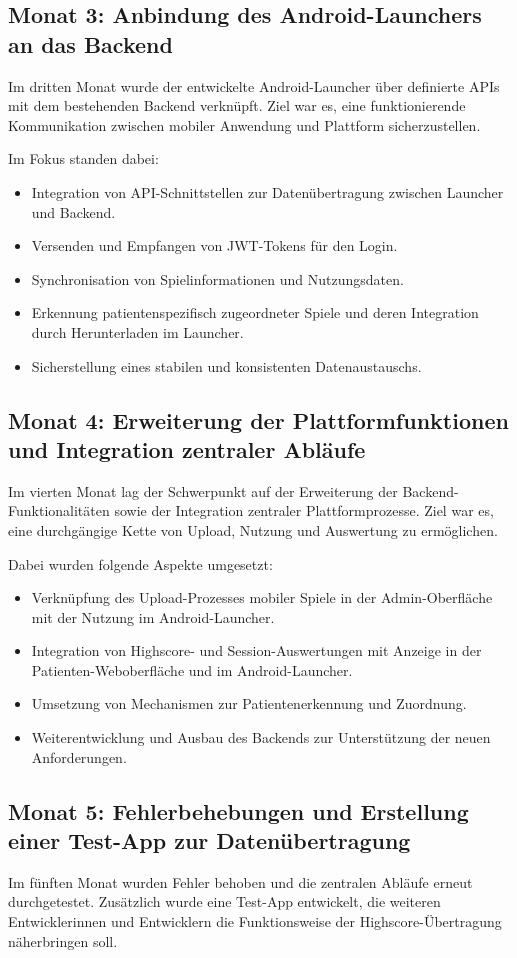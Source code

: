 \documentclass[a4paper,10pt,ngerman]{INSOproject}
\begin{document}
\subsection{Monat 3: Anbindung des Android-Launchers an das Backend}
Im dritten Monat wurde der entwickelte Android-Launcher über definierte APIs mit dem bestehenden Backend verknüpft. Ziel war es, eine funktionierende Kommunikation zwischen mobiler Anwendung und Plattform sicherzustellen.

Im Fokus standen dabei:
\begin{itemize}
  \item Integration von API-Schnittstellen zur Datenübertragung zwischen Launcher und Backend.
  \item Versenden und Empfangen von JWT-Tokens für den Login.
  \item Synchronisation von Spielinformationen und Nutzungsdaten.
  \item Erkennung patientenspezifisch zugeordneter Spiele und deren Integration durch Herunterladen im Launcher.
  \item Sicherstellung eines stabilen und konsistenten Datenaustauschs.
\end{itemize}

\subsection{Monat 4: Erweiterung der Plattformfunktionen und Integration zentraler Abläufe}
Im vierten Monat lag der Schwerpunkt auf der Erweiterung der Backend-Funktionalitäten sowie der Integration zentraler Plattformprozesse. Ziel war es, eine durchgängige Kette von Upload, Nutzung und Auswertung zu ermöglichen.

Dabei wurden folgende Aspekte umgesetzt:
\begin{itemize}
  \item Verknüpfung des Upload-Prozesses mobiler Spiele in der Admin-Oberfläche mit der Nutzung im Android-Launcher.
  \item Integration von Highscore- und Session-Auswertungen mit Anzeige in der Patienten-Weboberfläche und im Android-Launcher.
  \item Umsetzung von Mechanismen zur Patientenerkennung und Zuordnung.
  \item Weiterentwicklung und Ausbau des Backends zur Unterstützung der neuen Anforderungen.
\end{itemize}

\subsection{Monat 5: Fehlerbehebungen und Erstellung einer Test-App zur Datenübertragung}
Im fünften Monat wurden Fehler behoben und die zentralen Abläufe erneut durchgetestet. Zusätzlich wurde eine Test-App entwickelt, die weiteren Entwicklerinnen und Entwicklern die Funktionsweise der Highscore-Übertragung näherbringen soll.
\end{document}
